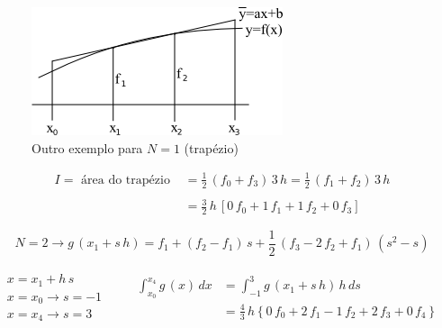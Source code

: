 \begin{example}


\begin{figure}[htb]
 \centering
 \includegraphics[scale=1.0]{capitulos/capitulo2/figuras/formula_newton_cotes2.png}
 \caption{Outro exemplo para $N = 1$ (trapézio)}
 \label{fig:formula_newton_cotes2}
\end{figure}

\[
 \begin{array}{ll}
  I = \mbox{ área do trapézio } & = \displaystyle \frac{1}{2} \, (f_0 + f_3) \, 3\,h = \frac{1}{2} \, (f_1 + f_2) \, 3\,h \\ \\
                                & = \displaystyle \frac{3}{2} \, h \, [0 \, f_0 + 1 \, f_1 + 1 \, f_2 + 0 \, f_3]
 \end{array}
\]

\[
 N = 2 \rightarrow g\,(x_1 + s\,h) = f_1 + (f_2 - f_1) \, s + \frac{1}{2} \, (f_3 - 2\,f_2 + f_1)\,(s^2 - s)
\]

\[
\begin{array}{l}
 \begin{array}{l}
  x = x_1 + h\,s \\
  x = x_0 \rightarrow s = -1 \\
  x = x_4 \rightarrow s = 3
 \end{array}
 \qquad
 \begin{array}{ll}
  \displaystyle \int_{x_0}^{x_4} g\,(x) \, dx & = \displaystyle \int_{-1}^3 g\,(x_1 + s\,h) \, h\,ds \\
                                & = \displaystyle \frac{4}{3} \, h \left\{ 0\,f_0 + 2\,f_1 - 1\,f_2 + 2\,f_3 + 0\,f_4 \right\}
 \end{array}
\end{array}
\]

\end{example}

